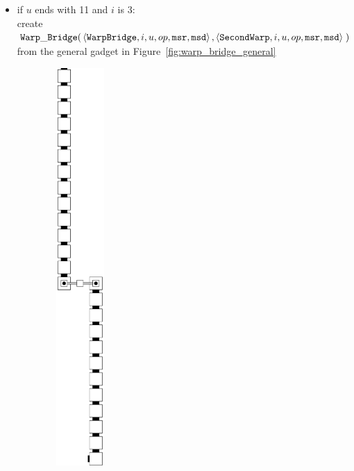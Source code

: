 \begin{itemize}
\begin{itemize}
            \item if $u$ ends with 11 and $i$ is 3: \\
            create
            $\begin{aligned}[t]
                {\tt Warp\_Bridge}(& \left\langle {\tt WarpBridge}, i, u, op, {\tt msr}, {\tt msd} \right\rangle,
                              \left\langle {\tt SecondWarp}, i, u, op, {\tt msr}, {\tt msd} \right\rangle \;)
            \end{aligned}$ \\ from the general gadget in Figure~\ref{fig:warp_bridge_general}
            \vspace{.5cm}
        \end{itemize}

        \begin{figure}[H]
            \centering
            \begin{subfigure}[t]{0.2\textwidth}
                \centering
                \includegraphics[width=0.2\textwidth]{warping/warp_bridge_general}

\end{subfigure}
\end{figure}
\end{itemize}
